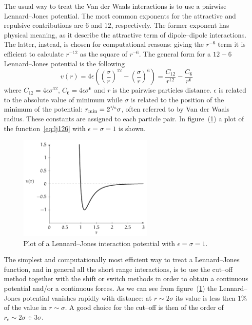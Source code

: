 The usual way to treat the Van der Waals interactions is to use a pairwise Lennard--Jones potential. The most
common exponents for the attractive and repulsive contributions are $6$ and $12$, respectively. The former 
exponent has physical meaning, as it describe the attractive term of dipole--dipole interactions. The latter, 
instead, is chosen for computational reasons: giving the $r^{-6}$ term it is efficient to calculate $r^{-12}$ as 
the square of $r^{-6}$. The general form for a $12-6$ Lennard--Jones potential is the following
\begin{equation}
	v(r) = 4\epsilon\left ( \left ( \frac{\sigma}{r}\right )^{12}  - \left ( \frac{\sigma}{r} \right )^6 \right ) = \frac{C_{12}}{r^{12}} - \frac{C_{6}}{r^{6}}
	\label{eq:lj126}
\end{equation}
where $C_{12} = 4\epsilon\sigma^{12}$, $C_{6} = 4\epsilon\sigma^{6}$ and $r$ is the pairwise particles distance.
$\epsilon$ is related to the absolute value of minimum while $\sigma$ is related to the position of the minimum
of the potential: $r_{\text{min}} = 2^{\nicefrac{1}{6}}\sigma$, often referred to by Van der Waals radius. These
constants are assigned to each particle pair. In figure~(\ref{fig:LG12511}) a plot of the 
function~\eqref{eq:lj126} with $\epsilon = \sigma = 1$ is shown.
\begin{figure}[!ht]
\centering
	\includegraphics[width=0.6\textwidth]{./img/LJ126/LJ126}
	\caption{Plot of a Lennard--Jones interaction potential with $\epsilon = \sigma = 1$.}
	\label{fig:LG12511}
\end{figure}

The simplest and computationally most efficient way to treat a Lennard--Jones function, and in general all the
short range interactions, is to use the cut--off method together with the shift or switch methods in order to
obtain a continuous potential and/or a continuous forces. As we can see from figure~(\ref{fig:LG12511}) the
Lennard--Jones potential vanishes rapidly with distance: at $r \sim 2\sigma$ its value is less then $1\%$ of the
value in $r \sim \sigma$. A good choice for the cut--off is then of the order of $r_c \sim 2\sigma \div 3\sigma$.

